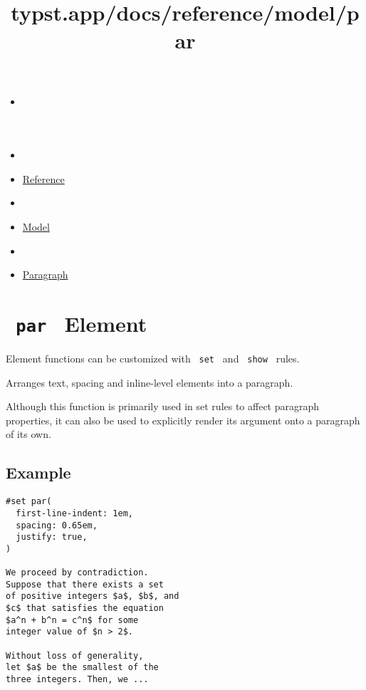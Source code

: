 \title{typst.app/docs/reference/model/par}

\begin{itemize}
\tightlist
\item
  \href{/docs}{}
\item
  
\item
  \href{/docs/reference/}{Reference}
\item
  
\item
  \href{/docs/reference/model/}{Model}
\item
  
\item
  \href{/docs/reference/model/par/}{Paragraph}
\end{itemize}

\section{\texorpdfstring{\texttt{\ par\ } {{ Element
}}}{ par   Element }}\label{summary}

\label{element-tooltip}
Element functions can be customized with \texttt{\ set\ } and
\texttt{\ show\ } rules.

Arranges text, spacing and inline-level elements into a paragraph.

Although this function is primarily used in set rules to affect
paragraph properties, it can also be used to explicitly render its
argument onto a paragraph of its own.

\subsection{Example}\label{example}

\begin{verbatim}
#set par(
  first-line-indent: 1em,
  spacing: 0.65em,
  justify: true,
)

We proceed by contradiction.
Suppose that there exists a set
of positive integers $a$, $b$, and
$c$ that satisfies the equation
$a^n + b^n = c^n$ for some
integer value of $n > 2$.

Without loss of generality,
let $a$ be the smallest of the
three integers. Then, we ...
\end{verbatim}


